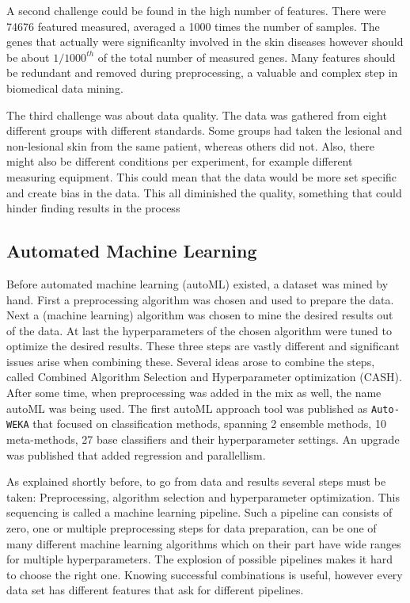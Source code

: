 \documentclass[10pt,a4paper]{article}
\begin{document}
	A second challenge could be found in the high number of features. There were 74676 featured measured, averaged a 1000 times the number of samples. The genes that actually were significanlty involved in the skin diseases however should be about $1/1000^{th}$ of the total number of measured genes. Many features should be redundant and removed during preprocessing, a valuable and complex step in biomedical data mining.
	
	 The third challenge was about data quality. The data was gathered from eight different groups with different standards. Some groups had taken the lesional and non-lesional skin from the same patient, whereas others did not. Also, there might also be different conditions per experiment, for example different measuring equipment. This could mean that the data would be more set specific and create bias in the data. This all diminished the quality, something that could hinder finding results in the process

	\subsection{Automated Machine Learning}
	\label{subsec:AutomatedMachineLearning}
	
	Before automated machine learning (autoML) existed, a dataset was mined by hand. First a preprocessing algorithm was chosen and used to prepare the data. Next a (machine learning) algorithm was chosen to mine the desired results out of the data. At last the hyperparameters of the chosen algorithm were tuned to optimize the desired results. These three steps are vastly different and significant issues arise when combining these. Several ideas arose to combine the steps, called Combined Algorithm Selection and Hyperparameter optimization (CASH).\cite{thornton2013auto} After some time, when preprocessing was added in the mix as well, the name autoML was being used.\cite{Gijsbers2017Thesis} The first autoML approach tool was published as \texttt{Auto-WEKA} that focused on classification methods, spanning 2 ensemble methods, 10 meta-methods, 27 base classifiers and their hyperparameter settings.\cite{thornton2013auto} An upgrade was published that added regression and parallellism.\cite{kotthoff2016auto}   
	
	As explained shortly before, to go from data and results several steps must be taken: Preprocessing, algorithm selection and hyperparameter optimization. This sequencing is called a machine learning pipeline. Such a pipeline can consists of zero, one or multiple preprocessing steps for data preparation, can be one of many different machine learning algorithms which on their part have wide ranges for multiple hyperparameters. The explosion of possible pipelines makes it hard to choose the right one. Knowing successful combinations is useful, however every data set has different features that ask for different pipelines. \cite{Gijsbers2017Thesis}
	
\end{document}
